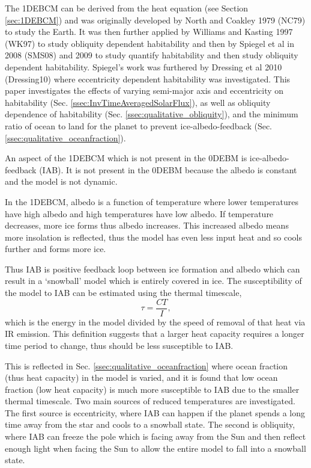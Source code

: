 \documentclass[12pt, onecolumn]{revtex4-2}    %
\begin{document}
The 1DEBCM can be derived from the heat equation (see Section \ref{sec:1DEBCM}) and was originally developed by North and Coakley 1979 (NC79) \cite{NC79} to study the Earth.
It was then further applied by Williams and Kasting 1997 (WK97) \cite{WK97} to study obliquity dependent habitability and then by Spiegel et al in 2008 (SMS08) \cite{SMS08} and 2009 \cite{SMS09} to study quantify habitability and then study obliquity dependent habitability.
Spiegel's work was furthered by Dressing et al 2010 (Dressing10) \cite{Dressing10} where eccentricity dependent habitability was investigated.
This paper investigates the effects of varying semi-major axis and eccentricity on habitability (Sec. \ref{ssec:InvTimeAveragedSolarFlux}), as well as obliquity dependence of habitability (Sec. \ref{ssec:qualitative_obliquity}), and the minimum ratio of ocean to land for the planet to prevent ice-albedo-feedback (Sec. \ref{ssec:qualitative_oceanfraction}).

%
An aspect of the 1DEBCM which is not present in the 0DEBM is ice-albedo-feedback (IAB).
It is not present in the 0DEBM because the albedo is constant and the model is not dynamic.

In the 1DEBCM, albedo is a function of temperature where lower temperatures have high albedo and high temperatures have low albedo.
If temperature decreases, more ice forms thus albedo increases.
This increased albedo means more insolation is reflected, thus the model has even less input heat and so cools further and forms more ice.

Thus IAB is positive feedback loop between ice formation and albedo which can result in a `snowball' model which is entirely covered in ice.
The susceptibility of the model to IAB can be estimated using the thermal timescale,
\begin{equation}
  \tau = \frac{C T}{I},
  \label{eq:ThermalTimescale}
\end{equation}
which is the energy in the model divided by the speed of removal of that heat via IR emission.
This definition suggests that a larger heat capacity requires a longer time period to change, thus should be less susceptible to IAB.

This is reflected in Sec. \ref{ssec:qualitative_oceanfraction} where ocean fraction (thus heat capacity) in the model is varied, and it is found that low ocean fraction (low heat capacity) is much more susceptible to IAB due to the smaller thermal timescale.
Two main sources of reduced temperatures are investigated.
The first source is eccentricity, where IAB can happen if the planet spends a long time away from the star and cools to a snowball state.
The second is obliquity, where IAB can freeze the pole which is facing away from the Sun and then reflect enough light when facing the Sun to allow the entire model to fall into a snowball state.
\end{document}
